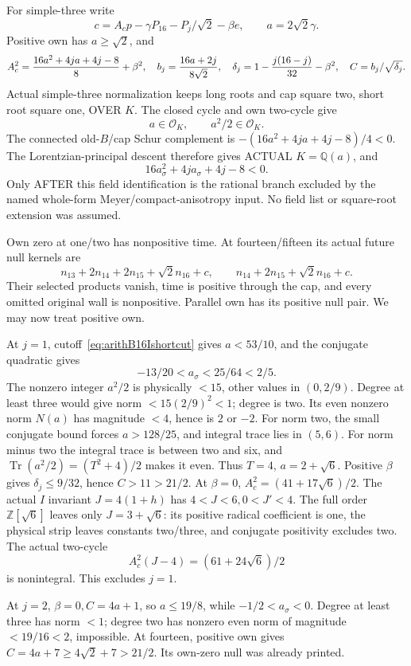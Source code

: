 For simple-three write
\[
 c=A_cp-\gamma P_{16}-P_j/\sqrt2-\beta e,\qquad a=2\sqrt2\gamma .
\]
Positive own has \(a\ge\sqrt2\), and
\[
 A_c^2={16a^2+4ja+4j-8\over8}+\beta^2,\quad
 b_j={16a+2j\over8\sqrt2},\quad
 \delta_j=1-{j(16-j)\over32}-\beta^2,\quad C=b_j/\sqrt{\delta_j}.
\]
Actual simple-three normalization keeps
long roots and cap square two, short
root square one, OVER \(K\).
The closed cycle and own two-cycle give
\[
                           a\in\mathcal O_K,\qquad a^2/2\in\mathcal O_K .
\]
The connected old-\(B\)/cap Schur
complement is
\(-(16a^2+4ja+4j-8)/4<0\).
The Lorentzian-principal descent therefore
gives ACTUAL \(K=\mathbb Q(a)\), and
\[
                          16a_\sigma^2+4ja_\sigma+4j-8<0 .
\]
Only AFTER this field identification is
the rational branch excluded by the
named whole-form Meyer/compact-anisotropy
input.
No field list or square-root extension
was assumed.

Own zero at one/two has nonpositive
time.
At fourteen/fifteen its actual future
null kernels are
\[
 n_{13}+2n_{14}+2n_{15}+\sqrt2n_{16}+c,\qquad
 n_{14}+2n_{15}+\sqrt2n_{16}+c .
\]
Their selected products vanish, time is
positive through the cap, and every
omitted original wall is nonpositive.
Parallel own has its positive null pair.
We may now treat positive own.

At \(j=1\), cutoff~\eqref{eq:arithB16Ishortcut}
gives \(a<53/10\), and the conjugate
quadratic gives
\[
                     -13/20<a_\sigma<25/64<2/5 .
\]
The nonzero integer \(a^2/2\) is
physically \(<15\), other values in
\((0,2/9)\).
Degree at least three would give norm
\(<15(2/9)^2<1\); degree is two.
Its even nonzero norm \(N(a)\) has
magnitude \(<4\), hence is \(2\) or \(-2\).
For norm two, the small conjugate bound
forces \(a>128/25\), and integral trace
lies in \((5,6)\).
For norm minus two the integral trace is
between two and six, and
\(\operatorname{Tr}(a^2/2)=(T^2+4)/2\)
makes it even.
Thus \(T=4\), \(a=2+\sqrt6\).
Positive \(\beta\) gives \(\delta_j\le9/32\),
hence \(C>11>21/2\).
At \(\beta=0\), \(A_c^2=(41+17\sqrt6)/2\).
The actual \(I\) invariant
\(J=4(1+h)\) has \(4<J<6,0<J'<4\).
The full order \(\mathbb Z[\sqrt6]\)
leaves only \(J=3+\sqrt6\):
its positive radical coefficient is one,
the physical strip leaves constants
two/three, and conjugate positivity
excludes two.
The actual two-cycle
\[
                     A_c^2(J-4)=(61+24\sqrt6)/2
\]
is nonintegral.  This excludes \(j=1\).

At \(j=2\), \(\beta=0,C=4a+1\),
so \(a\le19/8\), while
\(-1/2<a_\sigma<0\).
Degree at least three has norm \(<1\);
degree two has nonzero even norm of
magnitude \(<19/16<2\), impossible.
At fourteen, positive own gives
\(C=4a+7\ge4\sqrt2+7>21/2\).
Its own-zero null was already printed.

